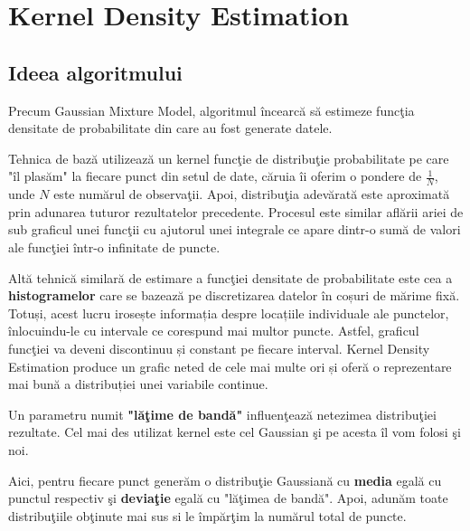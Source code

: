 \section{Kernel Density Estimation}

\subsection{Ideea algoritmului}

Precum Gaussian Mixture Model, algoritmul încearcă să estimeze 
funcţia densitate de probabilitate din care au fost generate datele.

Tehnica de bază utilizează un kernel funcţie de distribuţie probabilitate
pe care "îl plasăm" la fiecare punct din setul de date, căruia îi oferim o pondere 
de $\frac{1}{N}$, unde $N$ este numărul de observaţii. Apoi, distribuţia adevărată
este aproximată prin adunarea tuturor rezultatelor precedente. Procesul este similar 
aflării ariei de sub graficul unei funcţii cu ajutorul unei integrale ce 
apare dintr-o sumă de valori ale funcţiei într-o infinitate de puncte.

Altă tehnică similară de estimare a funcţiei densitate de 
probabilitate este cea a \textbf{histogramelor}
care se bazează
pe discretizarea datelor în coșuri de mărime fixă. 
Totuși, acest lucru irosește informația despre 
locațiile individuale ale punctelor, înlocuindu-le 
cu intervale ce corespund mai multor puncte. 
Astfel, graficul funcţiei va deveni discontinuu și 
constant pe fiecare interval. Kernel Density Estimation 
produce un grafic neted de cele mai multe ori și 
oferă o reprezentare mai bună a distribuției unei variabile 
continue\cite{KDE_paper}.

Un parametru numit \textbf{"lăţime de bandă"} influenţează netezimea distribuţiei 
rezultate.
Cel mai des utilizat kernel este cel Gaussian şi pe acesta îl vom folosi şi noi.

Aici, pentru fiecare punct generăm o distribuţie Gaussiană cu \textbf{media} egală
cu punctul respectiv şi \textbf{deviaţie} egală cu "lăţimea de bandă". Apoi, adunăm toate 
distribuţiile obţinute mai sus si le împărţim la numărul total de puncte.

